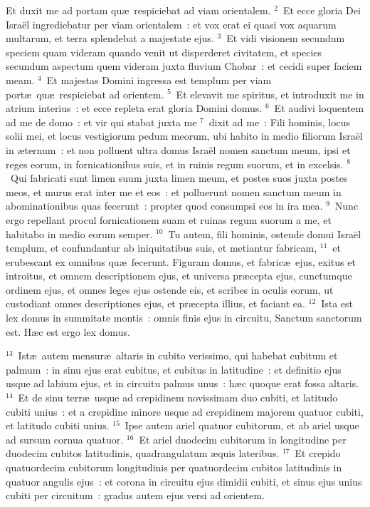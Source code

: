 \lettrine[lines=10,image=true,loversize=0.05,lraise=-0.03]{E}{}t duxit me ad portam qu\ae\ respiciebat ad viam orientalem.
${}^{2}$~Et ecce gloria Dei Isra\"el ingrediebatur per viam orientalem~: et vox erat ei quasi vox aquarum multarum, et terra splendebat a majestate ejus.
${}^{3}$~Et vidi visionem secundum speciem quam videram quando venit ut disperderet civitatem, et species secundum aspectum quem videram juxta fluvium Chobar~: et cecidi super faciem meam.
${}^{4}$~Et majestas Domini ingressa est templum per viam port\ae\ qu\ae\ respiciebat ad orientem.
${}^{5}$~Et elevavit me spiritus, et introduxit me in atrium interius~: et ecce repleta erat gloria Domini domus.
${}^{6}$~Et audivi loquentem ad me de domo~: et vir qui stabat juxta me
${}^{7}$~dixit ad me~: Fili hominis, locus solii mei, et locus vestigiorum pedum meorum, ubi habito in medio filiorum Isra\"el in \ae ternum~: et non polluent ultra domus Isra\"el nomen sanctum meum, ipsi et reges eorum, in fornicationibus suis, et in ruinis regum suorum, et in excelsis.
${}^{8}$~Qui fabricati sunt limen suum juxta limen meum, et postes suos juxta postes meos, et murus erat inter me et eos~: et polluerunt nomen sanctum meum in abominationibus quas fecerunt~: propter quod consumpsi eos in ira mea.
${}^{9}$~Nunc ergo repellant procul fornicationem suam et ruinas regum suorum a me, et habitabo in medio eorum semper.
${}^{10}$~Tu autem, fili hominis, ostende domui Isra\"el templum, et confundantur ab iniquitatibus suis, et metiantur fabricam,
${}^{11}$~et erubescant ex omnibus qu\ae\ fecerunt. Figuram domus, et fabric\ae\ ejus, exitus et introitus, et omnem descriptionem ejus, et universa pr\ae cepta ejus, cunctumque ordinem ejus, et omnes leges ejus ostende eis, et scribes in oculis eorum, ut custodiant omnes descriptiones ejus, et pr\ae cepta illius, et faciant ea.
${}^{12}$~Ista est lex domus in summitate montis~: omnis finis ejus in circuitu, Sanctum sanctorum est. H\ae c est ergo lex domus.


${}^{13}$~Ist\ae\ autem mensur\ae\ altaris in cubito verissimo, qui habebat cubitum et palmum~: in sinu ejus erat cubitus, et cubitus in latitudine~: et definitio ejus usque ad labium ejus, et in circuitu palmus unus~: h\ae c quoque erat fossa altaris.
${}^{14}$~Et de sinu terr\ae\ usque ad crepidinem novissimam duo cubiti, et latitudo cubiti unius~: et a crepidine minore usque ad crepidinem majorem quatuor cubiti, et latitudo cubiti unius.
${}^{15}$~Ipse autem ariel quatuor cubitorum, et ab ariel usque ad sursum cornua quatuor.
${}^{16}$~Et ariel duodecim cubitorum in longitudine per duodecim cubitos latitudinis, quadrangulatum \ae quis lateribus.
${}^{17}$~Et crepido quatuordecim cubitorum longitudinis per quatuordecim cubitos latitudinis in quatuor angulis ejus~: et corona in circuitu ejus dimidii cubiti, et sinus ejus unius cubiti per circuitum~: gradus autem ejus versi ad orientem.


